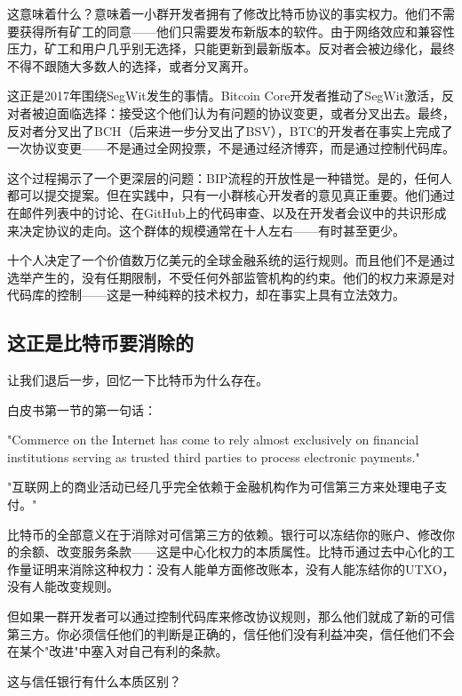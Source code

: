 \documentclass[a4paper,12pt,openany]{ctexbook}
\newenvironment{quoting}{%
  \par\vspace{0.5em}%
  \begin{list}{}{%
    \setlength{\leftmargin}{2em}%
    \setlength{\rightmargin}{2em}%
    \setlength{\parsep}{0.3em}%
    \setlength{\itemsep}{0pt}%
    \setlength{\topsep}{0pt}%
  }%
  \item\relax
}{%
  \end{list}%
  \par\vspace{0.5em}%
}
\begin{document}
这意味着什么？意味着一小群开发者拥有了修改比特币协议的事实权力。他们不需要获得所有矿工的同意——他们只需要发布新版本的软件。由于网络效应和兼容性压力，矿工和用户几乎别无选择，只能更新到最新版本。反对者会被边缘化，最终不得不跟随大多数人的选择，或者分叉离开。

这正是2017年围绕SegWit发生的事情。Bitcoin Core开发者推动了SegWit激活，反对者被迫面临选择：接受这个他们认为有问题的协议变更，或者分叉出去。最终，反对者分叉出了BCH（后来进一步分叉出了BSV），BTC的开发者在事实上完成了一次协议变更——不是通过全网投票，不是通过经济博弈，而是通过控制代码库。

这个过程揭示了一个更深层的问题：BIP流程的开放性是一种错觉。是的，任何人都可以提交提案。但在实践中，只有一小群核心开发者的意见真正重要。他们通过在邮件列表中的讨论、在GitHub上的代码审查、以及在开发者会议中的共识形成来决定协议的走向。这个群体的规模通常在十人左右——有时甚至更少。

十个人决定了一个价值数万亿美元的全球金融系统的运行规则。而且他们不是通过选举产生的，没有任期限制，不受任何外部监管机构的约束。他们的权力来源是对代码库的控制——这是一种纯粹的技术权力，却在事实上具有立法效力。


\subsection*{这正是比特币要消除的}


让我们退后一步，回忆一下比特币为什么存在。

白皮书第一节的第一句话：


\begin{quoting}
\small
"Commerce on the Internet has come to rely almost exclusively on financial institutions serving as trusted third parties to process electronic payments."

"互联网上的商业活动已经几乎完全依赖于金融机构作为可信第三方来处理电子支付。"
\end{quoting}


比特币的全部意义在于消除对可信第三方的依赖。银行可以冻结你的账户、修改你的余额、改变服务条款——这是中心化权力的本质属性。比特币通过去中心化的工作量证明来消除这种权力：没有人能单方面修改账本，没有人能冻结你的UTXO，没有人能改变规则。

但如果一群开发者可以通过控制代码库来修改协议规则，那么他们就成了新的可信第三方。你必须信任他们的判断是正确的，信任他们没有利益冲突，信任他们不会在某个"改进"中塞入对自己有利的条款。

这与信任银行有什么本质区别？
\end{document}
